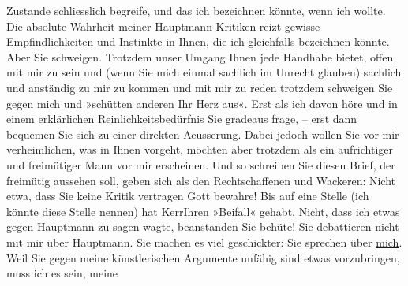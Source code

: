 \begin{ledgroupsized}[t]{13cm}
               Zustande schliesslich begreife, und das ich bezeichnen könnte, wenn ich wollte. Die
               absolute Wahrheit meiner Hauptmann-Kritiken reizt gewisse
               Empfindlichkeiten und Instinkte in Ihnen, die ich gleichfalls bezeichnen könnte.\pend
           \pstart
           Aber Sie schweigen. Trotzdem unser Umgang Ihnen jede Handhabe bietet, offen mit mir
               zu sein und (wenn Sie mich einmal sachlich im Unrecht glauben) sachlich und anständig
               zu mir zu kommen und mit mir zu reden {\dotstwo} trotzdem schweigen
               Sie gegen mich und »schütten anderen Ihr Herz aus«. Erst als ich davon höre und in
               einem erklärlichen Reinlichkeitsbedürfnis Sie gradeaus frage, – erst dann bequemen
               Sie sich zu einer direkten Aeusserung. Dabei jedoch wollen Sie vor mir verheimlichen,
               was in Ihnen vorgeht, möchten aber trotzdem als ein aufrichtiger und freimütiger Mann
               vor mir erscheinen.\pend
           \pstart
           Und so schreiben Sie diesen Brief, der freimütig aussehen soll, geben sich als den
               Rechtschaffenen und Wackeren: Nicht etwa, dass Sie keine Kritik vertragen {\dotstwo} Gott bewahre! Bis auf eine Stelle (ich könnte diese
               Stelle nennen) hat 
               KerrIhren »Beifall« gehabt. Nicht,
                  \uline{dass} ich etwas gegen Hauptmann zu sagen wagte, beanstanden Sie {\dotstwo} behüte! Sie debattieren nicht mit mir über Hauptmann. Sie machen es viel geschickter: Sie
               sprechen über \uline{mich}. Weil Sie gegen meine
               künstlerischen Argumente unfähig sind etwas vorzubringen, muss ich es sein, meine

\end{ledgroupsized}
